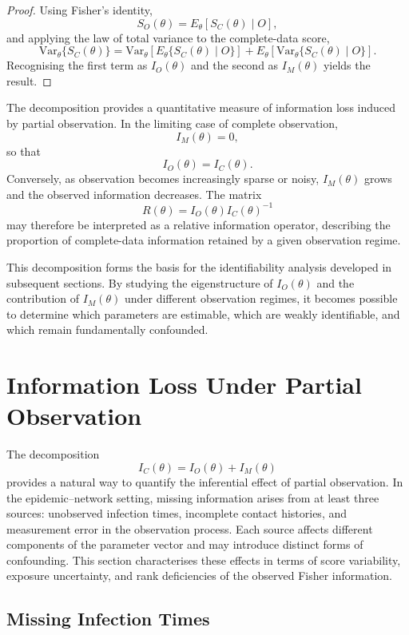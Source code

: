 \documentclass[10pt]{article}
\begin{document}
\begin{proof}
Using Fisher's identity,
\[
S_O(\theta)
=
E_\theta
\left[
S_C(\theta)\mid O
\right],
\]
and applying the law of total variance to the complete-data score,
\[
\mathrm{Var}_\theta\{S_C(\theta)\}
=
\mathrm{Var}_\theta
\left[
E_\theta\{S_C(\theta)\mid O\}
\right]
+
E_\theta
\left[
\mathrm{Var}_\theta
\{S_C(\theta)\mid O\}
\right].
\]
Recognising the first term as $I_O(\theta)$ and the second as $I_M(\theta)$ yields the result.
\end{proof}

The decomposition provides a quantitative measure of information loss induced by partial observation. In the limiting case of complete observation,
\[
I_M(\theta)=0,
\]
so that
\[
I_O(\theta)=I_C(\theta).
\]
Conversely, as observation becomes increasingly sparse or noisy, $I_M(\theta)$ grows and the observed information decreases. The matrix
\[
R(\theta)
=
I_O(\theta)I_C(\theta)^{-1}
\]
may therefore be interpreted as a relative information operator, describing the proportion of complete-data information retained by a given observation regime.

This decomposition forms the basis for the identifiability analysis developed in subsequent sections. By studying the eigenstructure of $I_O(\theta)$ and the contribution of $I_M(\theta)$ under different observation regimes, it becomes possible to determine which parameters are estimable, which are weakly identifiable, and which remain fundamentally confounded.


\section{Information Loss Under Partial Observation}
\label{sec5:inf-loss}
The decomposition
\[
I_C(\theta)=I_O(\theta)+I_M(\theta)
\]
provides a natural way to quantify the inferential effect of partial observation. In the epidemic--network setting, missing information arises from at least three sources: unobserved infection times, incomplete contact histories, and measurement error in the observation process. Each source affects different components of the parameter vector and may introduce distinct forms of confounding. This section characterises these effects in terms of score variability, exposure uncertainty, and rank deficiencies of the observed Fisher information.

\subsection{Missing Infection Times}
\end{document}
